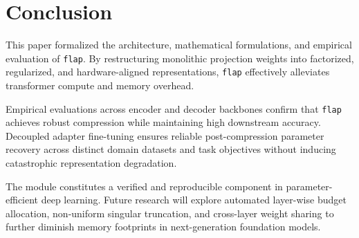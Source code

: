 \section{Conclusion}
This paper formalized the architecture, mathematical formulations, and empirical evaluation of \texttt{flap}. By restructuring monolithic projection weights into factorized, regularized, and hardware-aligned representations, \texttt{flap} effectively alleviates transformer compute and memory overhead.

Empirical evaluations across encoder and decoder backbones confirm that \texttt{flap} achieves robust compression while maintaining high downstream accuracy. Decoupled adapter fine-tuning ensures reliable post-compression parameter recovery across distinct domain datasets and task objectives without inducing catastrophic representation degradation.

The module constitutes a verified and reproducible component in parameter-efficient deep learning. Future research will explore automated layer-wise budget allocation, non-uniform singular truncation, and cross-layer weight sharing to further diminish memory footprints in next-generation foundation models.
